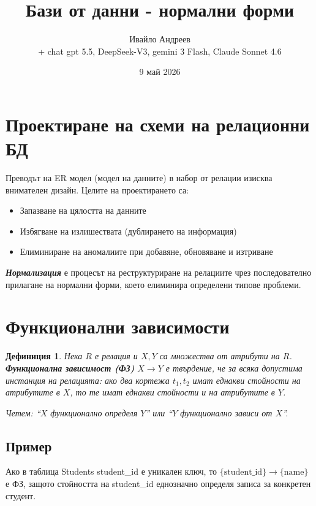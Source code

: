 \documentclass{scrartcl}
\title{Бази от данни - нормални форми}
\author{Ивайло Андреев \\+ chat gpt 5.5, DeepSeek-V3, gemini 3 Flash, Claude Sonnet 4.6}
\date{9 май 2026}
\newtheorem{definition}{Дефиниция}
\begin{document}
\maketitle

\tableofcontents
\newpage

\begin{FlushLeft}

\section{Проектиране на схеми на релационни БД}

Преводът на ER модел (модел на данните) в набор от релации изисква внимателен дизайн. Целите на проектирането са:

\begin{itemize}
    \item Запазване на цялостта на данните
    \item Избягване на излишествата (дублирането на информация)
    \item Елиминиране на аномалиите при добавяне, обновяване и изтриване
\end{itemize}

\textbf{\textit{Нормализация}} е процесът на реструктуриране на релациите чрез последователно прилагане на нормални форми, което елиминира определени типове проблеми.

\section{Функционални зависимости}

\begin{definition}
Нека $R$ е релация и $X, Y$ са множества от атрибути на $R$. \textbf{\textit{Функционална зависимост (ФЗ)}} $X \rightarrow Y$ е твърдение, че за всяка допустима инстанция на релацията: ако два кортежа $t_1, t_2$ имат еднакви стойности на атрибутите в $X$, то те имат еднакви стойности и на атрибутите в $Y$.

Четем: ``$X$ функционално определя $Y$'' или ``$Y$ функционално зависи от $X$''.
\end{definition}

\subsection{Пример}

Ако в таблица Students student\_id е уникален ключ, то $\{\text{student\_id}\} \rightarrow \{\text{name}\}$ е ФЗ, защото стойността на student\_id еднозначно определя записа за конкретен студент.




\end{FlushLeft}
\end{document}
